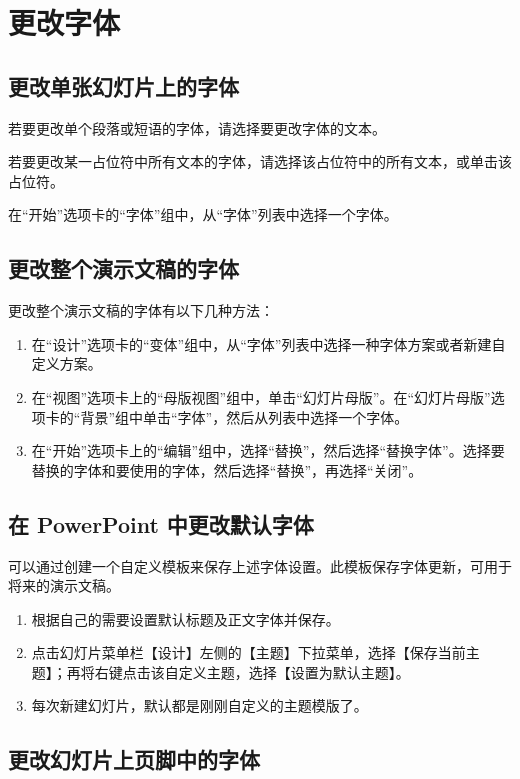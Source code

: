 \section{更改字体}

\subsection{更改单张幻灯片上的字体}

若要更改单个段落或短语的字体，请选择要更改字体的文本。

若要更改某一占位符中所有文本的字体，请选择该占位符中的所有文本，或单击该占位符。

在“开始”选项卡的“字体”组中，从“字体”列表中选择一个字体。

\subsection{更改整个演示文稿的字体}

更改整个演示文稿的字体有以下几种方法：

\begin{enumerate}
    \item 在“设计”选项卡的“变体”组中，从“字体”列表中选择一种字体方案或者新建自定义方案。
    \item 在“视图”选项卡上的“母版视图”组中，单击“幻灯片母版”。在“幻灯片母版”选项卡的“背景”组中单击“字体”，然后从列表中选择一个字体。
    \item 在“开始”选项卡上的“编辑”组中，选择“替换”，然后选择“替换字体”。选择要替换的字体和要使用的字体，然后选择“替换”，再选择“关闭”。
\end{enumerate}

\subsection{在 PowerPoint 中更改默认字体}

可以通过创建一个自定义模板来保存上述字体设置。此模板保存字体更新，可用于将来的演示文稿。
\begin{enumerate}
    \item 根据自己的需要设置默认标题及正文字体并保存。
    \item 点击幻灯片菜单栏【设计】左侧的【主题】下拉菜单，选择【保存当前主题】；再将右键点击该自定义主题，选择【设置为默认主题】。
    \item 每次新建幻灯片，默认都是刚刚自定义的主题模版了。
\end{enumerate}

\subsection{更改幻灯片上页脚中的字体}

